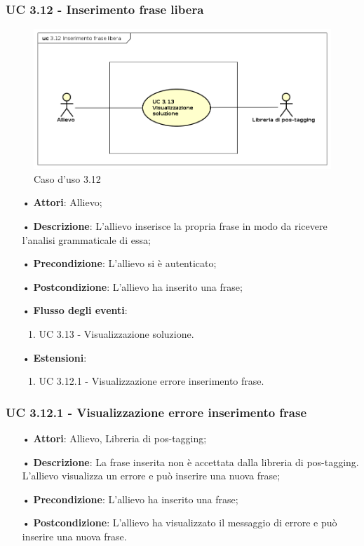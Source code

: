 \subsubsection{UC 3.12 - Inserimento frase libera}
\begin{figure}[H]
	\centering
	\includegraphics[width=17cm]{img/UC312.png} 
	\caption{Caso d'uso 3.12}\label{fig:312}
\end{figure}
\begin{itemize}
	\item[•]\textbf{Attori}: Allievo;
	\item[•]\textbf{Descrizione}: L'allievo inserisce la propria frase in modo da ricevere l'analisi grammaticale di essa;
	\item[•]\textbf{Precondizione}: L'allievo si è autenticato;
	\item[•]\textbf{Postcondizione}: L'allievo ha inserito una frase;
	\item[•]\textbf{Flusso degli eventi}:
	\begin{enumerate}
		\item UC 3.13 - Visualizzazione soluzione.
	\end{enumerate}
	\item[•]\textbf{Estensioni}:
	\begin{enumerate}
		\item UC 3.12.1 - Visualizzazione errore inserimento frase.
	\end{enumerate}
\end{itemize}


\subsubsection{UC 3.12.1 - Visualizzazione errore inserimento frase}
\begin{itemize}
\item[•]\textbf{Attori}: Allievo, Libreria di pos-tagging;
\item[•]\textbf{Descrizione}: La frase inserita non è accettata dalla libreria di pos-tagging. L'allievo visualizza un errore e può inserire una nuova frase;
\item[•]\textbf{Precondizione}: L'allievo ha inserito una frase;
\item[•]\textbf{Postcondizione}: L'allievo ha visualizzato il messaggio di errore e può inserire una nuova frase.
\end{itemize}


